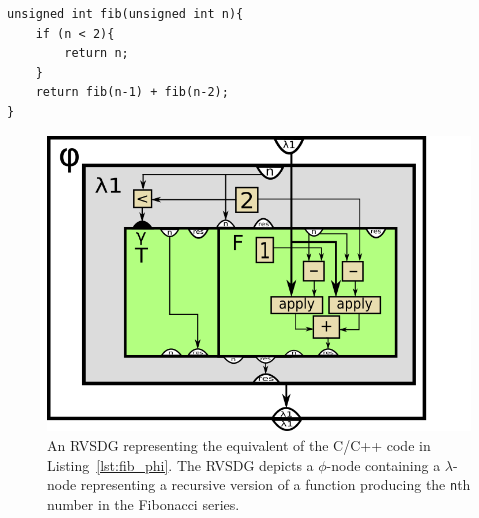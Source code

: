 \begin{centering}
	\noindent\begin{minipage}{\textwidth}
		\begin{CenteredBox}
		\begin{lstlisting}[style=global_customcpp]
unsigned int fib(unsigned int n){
	if (n < 2){
		return n;
	}
	return fib(n-1) + fib(n-2);
}
		\end{lstlisting}
		\end{CenteredBox}
	\end{minipage}
	\label{lst:fib_phi}
\end{centering}

\begin{figure}[h!]
	\centering
	\includegraphics[width=\textwidth]{figures/recursive_fibonacci}
	\caption{An RVSDG representing the equivalent of the C/C++ code in
Listing~\ref{lst:fib_phi}. The RVSDG depicts a $\phi$-node containing a
$\lambda$-node representing a recursive version of a function producing the
\lstinline!n!th number in the Fibonacci series.}
	\label{fig:fib_phi}
\end{figure}
